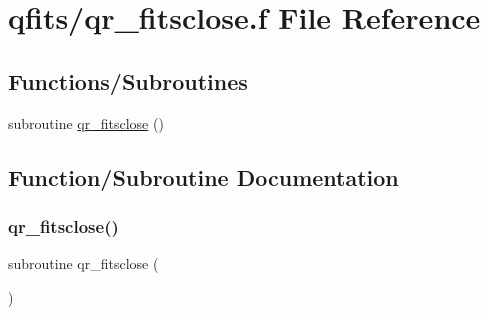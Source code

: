 \hypertarget{qr__fitsclose_8f}{}\section{qfits/qr\+\_\+fitsclose.f File Reference}
\label{qr__fitsclose_8f}
\subsection*{Functions/\+Subroutines}
\begin{DoxyCompactItemize}
\item 
subroutine \hyperlink{qr__fitsclose_8f_a7bf3599b78f5ee60ceb10c73028ce8bd}{qr\+\_\+fitsclose} ()
\end{DoxyCompactItemize}


\subsection{Function/\+Subroutine Documentation}
\mbox{\label{qr__fitsclose_8f_a7bf3599b78f5ee60ceb10c73028ce8bd}} 
\subsubsection{\texorpdfstring{qr\+\_\+fitsclose()}{qr\_fitsclose()}}
{\footnotesize\ttfamily subroutine qr\+\_\+fitsclose (\begin{DoxyParamCaption}{ }\end{DoxyParamCaption})}

